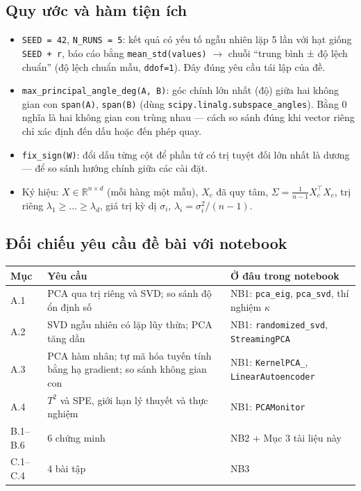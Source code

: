\documentclass[11pt,a4paper]{article}
\newcommand{\code}[1]{\texttt{#1}}
\newcommand{\R}{\mathbb{R}}
\begin{document}
\subsection{Quy ước và hàm tiện ích}
\begin{itemize}
\item \code{SEED = 42}, \code{N\_RUNS = 5}: kết quả có yếu tố ngẫu nhiên lặp 5 lần với hạt giống \code{SEED + r}, báo cáo bằng \code{mean\_std(values)} $\to$ chuỗi ``trung bình ± độ lệch chuẩn'' (độ lệch chuẩn mẫu, \code{ddof=1}). Đây đúng yêu cầu tái lập của đề.
\item \code{max\_principal\_angle\_deg(A, B)}: góc chính lớn nhất (độ) giữa hai không gian con \code{span(A)}, \code{span(B)} (dùng \code{scipy.linalg.subspace\_angles}). Bằng 0 nghĩa là hai không gian con trùng nhau — cách so sánh đúng khi vector riêng chỉ xác định đến dấu hoặc đến phép quay.
\item \code{fix\_sign(W)}: đổi dấu từng cột để phần tử có trị tuyệt đối lớn nhất là dương — để so sánh hướng chính giữa các cài đặt.
\item Ký hiệu: $X\in\R^{n\times d}$ (mỗi hàng một mẫu), $X_c$ đã quy tâm, $\Sigma=\frac1{n-1}X_c^\top X_c$, trị riêng $\lambda_1\ge\dots\ge\lambda_d$, giá trị kỳ dị $\sigma_i$, $\lambda_i=\sigma_i^2/(n-1)$.
\end{itemize}

\subsection{Đối chiếu yêu cầu đề bài với notebook}
\begin{center}
\renewcommand{\arraystretch}{1.2}
\begin{tabularx}{\linewidth}{@{}l>{\raggedright}p{7.2cm}X@{}}
\toprule
\textbf{Mục} & \textbf{Yêu cầu} & \textbf{Ở đâu trong notebook} \\
\midrule
A.1 & PCA qua trị riêng và SVD; so sánh độ ổn định số & NB1: \code{pca\_eig}, \code{pca\_svd}, thí nghiệm $\kappa$ \\
A.2 & SVD ngẫu nhiên có lặp lũy thừa; PCA tăng dần & NB1: \code{randomized\_svd}, \code{StreamingPCA} \\
A.3 & PCA hàm nhân; tự mã hóa tuyến tính bằng hạ gradient; so sánh không gian con & NB1: \code{KernelPCA\_}, \code{LinearAutoencoder} \\
A.4 & $T^2$ và SPE, giới hạn lý thuyết và thực nghiệm & NB1: \code{PCAMonitor} \\
B.1–B.6 & 6 chứng minh & NB2 + Mục 3 tài liệu này \\
C.1–C.4 & 4 bài tập & NB3 \\
\bottomrule
\end{tabularx}
\end{center}
\end{document}
